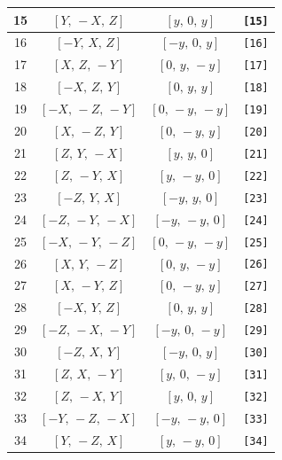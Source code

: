 \documentclass[fleqn,8pt]{jsarticle}
\begin{document}
\begin{longtable}{cccc}
15 & $\left[ Y,\, - X,\, Z \right]$ & $\left[ y,\, 0,\, y \right]$ & {\tt [15]} \\ \hline
16 & $\left[ - Y,\, X,\, Z \right]$ & $\left[ - y,\, 0,\, y \right]$ & {\tt [16]} \\ \hline
17 & $\left[ X,\, Z,\, - Y \right]$ & $\left[ 0,\, y,\, - y \right]$ & {\tt [17]} \\ \hline
18 & $\left[ - X,\, Z,\, Y \right]$ & $\left[ 0,\, y,\, y \right]$ & {\tt [18]} \\ \hline
19 & $\left[ - X,\, - Z,\, - Y \right]$ & $\left[ 0,\, - y,\, - y \right]$ & {\tt [19]} \\ \hline
20 & $\left[ X,\, - Z,\, Y \right]$ & $\left[ 0,\, - y,\, y \right]$ & {\tt [20]} \\ \hline
21 & $\left[ Z,\, Y,\, - X \right]$ & $\left[ y,\, y,\, 0 \right]$ & {\tt [21]} \\ \hline
22 & $\left[ Z,\, - Y,\, X \right]$ & $\left[ y,\, - y,\, 0 \right]$ & {\tt [22]} \\ \hline
23 & $\left[ - Z,\, Y,\, X \right]$ & $\left[ - y,\, y,\, 0 \right]$ & {\tt [23]} \\ \hline
24 & $\left[ - Z,\, - Y,\, - X \right]$ & $\left[ - y,\, - y,\, 0 \right]$ & {\tt [24]} \\ \hline
25 & $\left[ - X,\, - Y,\, - Z \right]$ & $\left[ 0,\, - y,\, - y \right]$ & {\tt [25]} \\ \hline
26 & $\left[ X,\, Y,\, - Z \right]$ & $\left[ 0,\, y,\, - y \right]$ & {\tt [26]} \\ \hline
27 & $\left[ X,\, - Y,\, Z \right]$ & $\left[ 0,\, - y,\, y \right]$ & {\tt [27]} \\ \hline
28 & $\left[ - X,\, Y,\, Z \right]$ & $\left[ 0,\, y,\, y \right]$ & {\tt [28]} \\ \hline
29 & $\left[ - Z,\, - X,\, - Y \right]$ & $\left[ - y,\, 0,\, - y \right]$ & {\tt [29]} \\ \hline
30 & $\left[ - Z,\, X,\, Y \right]$ & $\left[ - y,\, 0,\, y \right]$ & {\tt [30]} \\ \hline
31 & $\left[ Z,\, X,\, - Y \right]$ & $\left[ y,\, 0,\, - y \right]$ & {\tt [31]} \\ \hline
32 & $\left[ Z,\, - X,\, Y \right]$ & $\left[ y,\, 0,\, y \right]$ & {\tt [32]} \\ \hline
33 & $\left[ - Y,\, - Z,\, - X \right]$ & $\left[ - y,\, - y,\, 0 \right]$ & {\tt [33]} \\ \hline
34 & $\left[ Y,\, - Z,\, X \right]$ & $\left[ y,\, - y,\, 0 \right]$ & {\tt [34]} \\ \hline

\end{longtable}
\end{document}

